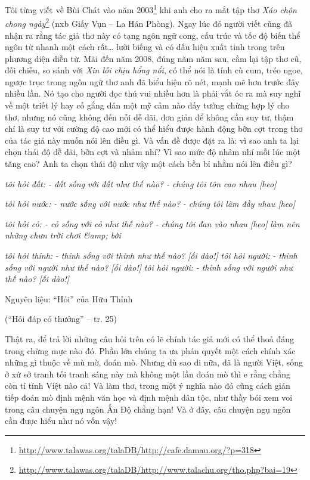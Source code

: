 \documentclass[../main.tex]{subfiles}
\begin{document}
\begin{multicols}{2}
Tôi từng viết về Bùi Chát vào năm 2003\footnote{\url{http://www.talawas.org/talaDB/http://cafe.damau.org/?p=318}} khi anh cho ra mắt tập thơ \textit{Xáo chộn chong ngày}\footnote{\url{http://www.talawas.org/talaDB/http://www.talachu.org/tho.php?bai=19}}\textit{ }(nxb Giấy Vụn – La Hán Phòng). Ngay lúc đó người viết cũng đã nhận ra rằng tác giả thơ này có tạng ngôn ngữ cong, cấu trúc và tốc độ biến thể ngôn từ nhanh một cách rất… lười biếng và có dấu hiệu xuất tinh trong trên phương diện diễn từ. Mãi đến năm 2008, đúng năm năm sau, cầm lại tập thơ cũ, đối chiếu, so sánh với \textit{Xin lỗi chịu hổng nổi}, có thể nói là tính cù cum, tréo ngoe, ngược trục trong ngôn ngữ thơ anh đã biểu hiện rõ nét, mạnh mẽ hơn trước đây nhiều lần. Nó tạo cho người đọc thú vui nhiều hơn là phải vắt óc ra mà suy nghĩ về một triết lý hay cố gắng dán một mỹ cảm nào đấy tưởng chừng hợp lý cho thơ, nhưng nó cũng không đến nỗi dễ dãi, đơn giản để không cần suy tư, thậm chí là suy tư với cường độ cao mới có thể hiểu được hành động bỡn cợt trong thơ của tác giả này muốn nói lên điều gì. Và vấn đề được đặt ra là: vì sao anh ta lại chọn thái độ dễ dãi, bỡn cợt và nhảm nhí? Vì sao mức độ nhảm nhí mỗi lúc một tăng cao? Anh ta chọn thái độ như vậy một cách bền bỉ nhằm nói lên điều gì? 
\begin{blockquote}


\textit{tôi hỏi đất: - đất sống với đất như thế nào?} 
\textit{- chúng tôi tôn cao nhau [heo]} 

\textit{tôi hỏi nước: - nước sống với nước như thế nào?} 
\textit{- chúng tôi làm đầy nhau [heo]} 

\textit{tôi hỏi cỏ: - cỏ sống với cỏ như thế nào?} 
\textit{- chúng tôi đan vào nhau [heo]} 
\textit{làm nên những chưn trời} 
\textit{chơi &amp; bời} 

\textit{tôi hỏi thỉnh: }
\textit{- thỉnh sống với thỉnh như thế nào?} 
\textit{[ối dào!]} 
\textit{tôi hỏi người:} 
\textit{- thỉnh sống với người như thế nào?} 
\textit{[ối dào!]} 
\textit{tôi hỏi người:} 
\textit{- thỉnh sống với người như thế nào?} 
\textit{[ối dào!]} 

Nguyên liệu: “Hỏi” của Hữu Thỉnh 

(“Hỏi đáp có thưởng” – tr. 25) 

\end{blockquote}


Thật ra, để trả lời những câu hỏi trên có lẽ chính tác giả mới có thể thoả đáng trong chừng mực nào đó. Phần lớn chúng ta ưa phán quyết một cách chính xác những gì thuộc về mù mờ, đoán mò. Nhưng dù sao đi nữa, đã là người Việt, sống ở xứ sở tranh tối tranh sáng này mà không một lần đoán mò thì e rằng chẳng còn tí tính Việt nào cả! Và làm thơ, trong một ý nghĩa nào đó cũng cách gián tiếp đoán mò định mệnh văn học và định mệnh dân tộc, như thầy bói xem voi trong câu chuyện ngụ ngôn Ấn Độ chẳng hạn! Và ở đây, câu chuyện ngụ ngôn cần được hiểu như nó vốn vậy! 
\begin{blockquote}



\end{blockquote}
\end{multicols}
\end{document}
